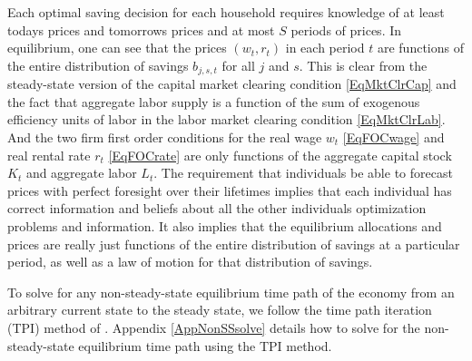 \documentclass[letterpaper,12pt]{article}
\theoremstyle{definition}
\begin{document}
\begin{spacing}{1.5}
    Each optimal saving decision for each household requires knowledge of at least todays prices and tomorrows prices and at most $S$ periods of prices. In equilibrium, one can see that the prices $(w_t,r_t)$ in each period $t$ are functions of the entire distribution of savings $b_{j,s,t}$ for all $j$ and $s$. This is clear from the steady-state version of the capital market clearing condition \eqref{EqMktClrCap} and the fact that aggregate labor supply is a function of the sum of exogenous efficiency units of labor in the labor market clearing condition \eqref{EqMktClrLab}. And the two firm first order conditions for the real wage $w_t$ \eqref{EqFOCwage} and real rental rate $r_t$ \eqref{EqFOCrate} are only functions of the aggregate capital stock $K_t$ and aggregate labor $L_t$. The requirement that individuals be able to forecast prices with perfect foresight over their lifetimes implies that each individual has correct information and beliefs about all the other individuals optimization problems and information. It also implies that the equilibrium allocations and prices are really just functions of the entire distribution of savings at a particular period, as well as a law of motion for that distribution of savings.

    To solve for any non-steady-state equilibrium time path of the economy from an arbitrary current state to the steady state, we follow the time path iteration (TPI) method of \citet{AuerbachKotlikoff:1987}. Appendix \ref{AppNonSSsolve} details how to solve for the non-steady-state equilibrium time path using the TPI method.








\end{spacing}
\end{document}
